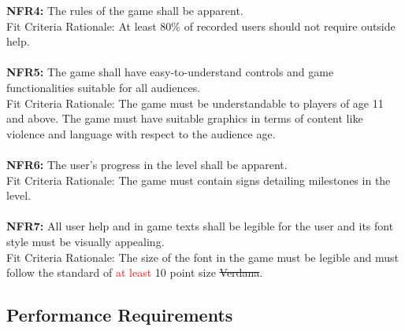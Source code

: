 \documentclass[12pt, titlepage]{article}
\begin{document}
\textbf{NFR4:} The rules of the game shall be apparent.\\
Fit Criteria Rationale: At least 80\% of recorded users should not require outside help.\\\\
\textbf{NFR5:} The game shall have easy-to-understand controls and game functionalities suitable for all audiences.\\
Fit Criteria Rationale: The game must be understandable to players of age 11 and above. The game must have suitable graphics in terms of content like violence and language with respect to the audience age.\\\\
\textbf{NFR6:} The user's progress in the level shall be apparent.\\
Fit Criteria Rationale: The game must contain signs detailing milestones in the level.\\\\
\textbf{NFR7:} All user help and in game texts shall be legible for the user and its font style must be visually appealing.\\
Fit Criteria Rationale: The size of the font in the game must be legible and must follow the standard of \textcolor{red}{at least} 10 point size \st{Verdana}.\\


\subsection{Performance Requirements}
\end{document}
